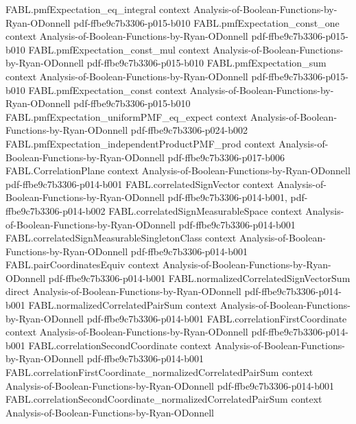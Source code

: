 \begin{theorem}
\proofstep
  {FABL.pmfExpectation_eq_integral}
  {context}
  {Analysis-of-Boolean-Functions-by-Ryan-ODonnell}
  {pdf-ffbe9c7b3306-p015-b010}
\proofstep
  {FABL.pmfExpectation_const_one}
  {context}
  {Analysis-of-Boolean-Functions-by-Ryan-ODonnell}
  {pdf-ffbe9c7b3306-p015-b010}
\proofstep
  {FABL.pmfExpectation_const_mul}
  {context}
  {Analysis-of-Boolean-Functions-by-Ryan-ODonnell}
  {pdf-ffbe9c7b3306-p015-b010}
\proofstep
  {FABL.pmfExpectation_sum}
  {context}
  {Analysis-of-Boolean-Functions-by-Ryan-ODonnell}
  {pdf-ffbe9c7b3306-p015-b010}
\proofstep
  {FABL.pmfExpectation_const}
  {context}
  {Analysis-of-Boolean-Functions-by-Ryan-ODonnell}
  {pdf-ffbe9c7b3306-p015-b010}
\proofstep
  {FABL.pmfExpectation_uniformPMF_eq_expect}
  {context}
  {Analysis-of-Boolean-Functions-by-Ryan-ODonnell}
  {pdf-ffbe9c7b3306-p024-b002}
\proofstep
  {FABL.pmfExpectation_independentProductPMF_prod}
  {context}
  {Analysis-of-Boolean-Functions-by-Ryan-ODonnell}
  {pdf-ffbe9c7b3306-p017-b006}
\proofstep
  {FABL.CorrelationPlane}
  {context}
  {Analysis-of-Boolean-Functions-by-Ryan-ODonnell}
  {pdf-ffbe9c7b3306-p014-b001}
\proofstep
  {FABL.correlatedSignVector}
  {context}
  {Analysis-of-Boolean-Functions-by-Ryan-ODonnell}
  {pdf-ffbe9c7b3306-p014-b001,
    pdf-ffbe9c7b3306-p014-b002}
\proofstep
  {FABL.correlatedSignMeasurableSpace}
  {context}
  {Analysis-of-Boolean-Functions-by-Ryan-ODonnell}
  {pdf-ffbe9c7b3306-p014-b001}
\proofstep
  {FABL.correlatedSignMeasurableSingletonClass}
  {context}
  {Analysis-of-Boolean-Functions-by-Ryan-ODonnell}
  {pdf-ffbe9c7b3306-p014-b001}
\proofstep
  {FABL.pairCoordinatesEquiv}
  {context}
  {Analysis-of-Boolean-Functions-by-Ryan-ODonnell}
  {pdf-ffbe9c7b3306-p014-b001}
\proofstep
  {FABL.normalizedCorrelatedSignVectorSum}
  {direct}
  {Analysis-of-Boolean-Functions-by-Ryan-ODonnell}
  {pdf-ffbe9c7b3306-p014-b001}
\proofstep
  {FABL.normalizedCorrelatedPairSum}
  {context}
  {Analysis-of-Boolean-Functions-by-Ryan-ODonnell}
  {pdf-ffbe9c7b3306-p014-b001}
\proofstep
  {FABL.correlationFirstCoordinate}
  {context}
  {Analysis-of-Boolean-Functions-by-Ryan-ODonnell}
  {pdf-ffbe9c7b3306-p014-b001}
\proofstep
  {FABL.correlationSecondCoordinate}
  {context}
  {Analysis-of-Boolean-Functions-by-Ryan-ODonnell}
  {pdf-ffbe9c7b3306-p014-b001}
\proofstep
  {FABL.correlationFirstCoordinate_normalizedCorrelatedPairSum}
  {context}
  {Analysis-of-Boolean-Functions-by-Ryan-ODonnell}
  {pdf-ffbe9c7b3306-p014-b001}
\proofstep
  {FABL.correlationSecondCoordinate_normalizedCorrelatedPairSum}
  {context}
  {Analysis-of-Boolean-Functions-by-Ryan-ODonnell}

\end{theorem}
